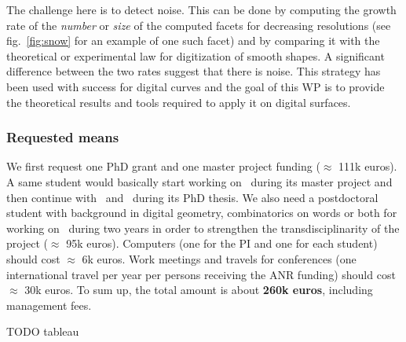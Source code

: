 The challenge here is to detect noise. This can be done by computing the growth rate of the \emph{number} or \emph{size} of the computed facets for decreasing resolutions (see fig.~\ref{fig:snow} for an example of one such facet) and by comparing it with the theoretical or experimental law for digitization of smooth shapes. A significant difference between the two rates suggest that there is noise. 
This strategy has been used with success for digital curves \cite{Kerautret2012} and the goal of this WP is to provide the theoretical results and tools required to apply it on digital surfaces. 


\newpage

\subsubsection{Requested means}
\label{sec:ressources}




We first request one PhD grant and one master project funding ($\approx$ 111k euros). A same student would basically start working on \wpPPA~during its master project and then continue with \wpEstim~and \wpScale~during its PhD thesis. We also need a postdoctoral student with background in digital geometry, combinatorics on words or both for working on \wpPattern~during two years in order to strengthen the transdisciplinarity of the project ($\approx$ 95k euros). 
Computers (one for the PI and one for each student) should cost $\approx$ 6k euros. Work meetings and travels for conferences (one international travel per year per persons receiving the ANR funding) should cost $\approx$ 30k euros. 
To sum up, the total amount is about \textbf{260k euros}, including management fees. 

TODO tableau

